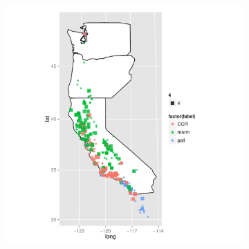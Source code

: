 \documentclass{article}\usepackage{graphicx, color}
\begin{document}
\begin{figure}[t]
\begin{subfigure}[b]{0.5\textwidth}
    \includegraphics[width = \textwidth]{figure/multi-map2}
    \label{fig:multi-map2}
  \end{subfigure}\\


\end{figure}
\end{document}
